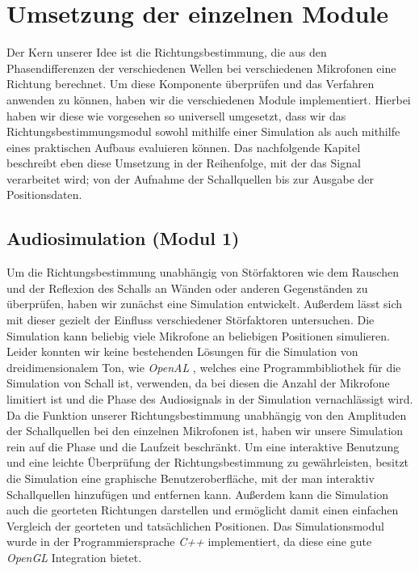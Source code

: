 \section{Umsetzung der einzelnen Module} 
Der Kern unserer Idee ist die Richtungsbestimmung, die aus den Phasendifferenzen der verschiedenen Wellen bei verschiedenen Mikrofonen eine Richtung berechnet. Um diese Komponente überprüfen und das Verfahren anwenden zu können, haben wir die verschiedenen Module implementiert. Hierbei haben wir diese wie vorgesehen so universell umgesetzt, dass wir das Richtungsbestimmungsmodul sowohl mithilfe einer Simulation als auch mithilfe eines praktischen Aufbaus evaluieren können. Das nachfolgende Kapitel beschreibt eben diese Umsetzung in der Reihenfolge, mit der das Signal verarbeitet wird; von der Aufnahme der Schallquellen bis zur Ausgabe der Positionsdaten.

\subsection{Audiosimulation (Modul 1)}
Um die Richtungsbestimmung unabhängig von Störfaktoren wie dem Rauschen und der Reflexion des Schalls an Wänden oder anderen Gegenständen zu überprüfen, haben wir zunächst eine Simulation entwickelt. Außerdem lässt sich mit dieser gezielt der Einfluss verschiedener Störfaktoren untersuchen. Die Simulation kann beliebig viele Mikrofone an beliebigen Positionen simulieren. Leider konnten wir keine bestehenden Lösungen für die Simulation von dreidimensionalem Ton, wie \textit{OpenAL} \cite{OpenAL}, welches eine Programmbibliothek für die Simulation von Schall ist, verwenden, da bei diesen die Anzahl der Mikrofone limitiert ist und die Phase des Audiosignals in der Simulation vernachlässigt wird. Da die Funktion unserer Richtungsbestimmung unabhängig von den Amplituden der Schallquellen bei den einzelnen Mikrofonen ist, haben wir unsere Simulation rein auf die Phase und die Laufzeit beschränkt. Um eine interaktive Benutzung und eine leichte Überprüfung der Richtungsbestimmung zu gewährleisten, besitzt die Simulation eine graphische Benutzeroberfläche, mit der man interaktiv Schallquellen hinzufügen und entfernen kann. Außerdem kann die Simulation auch die georteten Richtungen darstellen und ermöglicht damit einen einfachen Vergleich der georteten und tatsächlichen Positionen. Das Simulationsmodul wurde in der Programmiersprache \textit{C++} implementiert, da diese eine gute \textit{OpenGL} Integration bietet.

